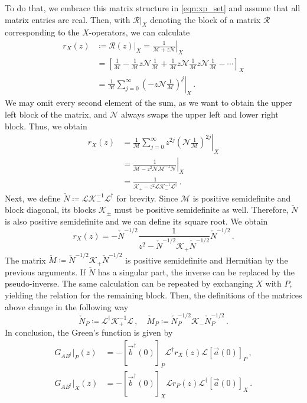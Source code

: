 \documentclass[
    reprint, 
    aps,
    preprintnumbers,
    twocolumn,
    prb,
    superscriptaddress
]{revtex4-2}
\newcommand{\mM}{\mathcal{M}}
\newcommand{\mN}{\mathcal{N}}
\begin{document}
To do that, we embrace this matrix structure in \eqref{eqn:xp_set} and assume that all matrix entries are real.
Then, with $\mathcal{R}|_X$ denoting the block of a matrix $\mathcal{R}$ corresponding to the $X$-operators, we can calculate
\begin{align}
    r_X (z) &\coloneqq \mathcal{R}(z)|_X = \left. \frac{1}{\mM + z \mN} \right\vert_X \nonumber \\
        &= \left[ \frac{1}{\mM} - \frac{1}{\mM} z \mN \frac{1}{\mM} + \frac{1}{\mM} z \mN \frac{1}{\mM} z \mN \frac{1}{\mM} - \cdots \right]_X \nonumber \\
        &= \left. \frac{1}{\mM} \sum_{j=0}^\infty \left( -z \mN \frac{1}{\mM} \right)^j \right\vert_X \,.
\end{align}
We may omit every second element of the sum, as we want to obtain the upper left block of the matrix, and $\mN$ always swaps the upper left and lower right block.
Thus, we obtain
\begin{align}
    r_X (z) &= \left. \frac{1}{\mM} \sum_{j=0}^\infty z^{2j} \left( \mN \frac{1}{\mM} \right)^{2j} \right\vert_X \nonumber \\
        &= \left. \frac{1}{\mM - z^2 \mN \mM^{-1} \mN} \right\vert_X \nonumber \\
        &= \frac{1}{\mathcal{K}_+ - z^2 \mathcal{L} \mathcal{K}_-^{-1} \mathcal{L}^\dagger}\,.
\end{align}
Next, we define $\check{N} \coloneqq \mathcal{L} \mathcal{K}_-^{-1} \mathcal{L}^\dagger$ for brevity.
Since $\mathcal{M}$ is positive semidefinite and block diagonal, its blocks $\mathcal{K}_\pm$ must be positive semidefinite as well.
Therefore, $\check{N}$ is also positive semidefinite and we can define its square root.
We obtain
\begin{equation}
    r_X (z) = -\check{N}^{-1/2} \frac{1}{z^2 - \check{N}^{-1/2} \mathcal{K}_+ \check{N}^{-1/2}} \check{N}^{-1/2}\,.
\end{equation}
The matrix $\check{M} \coloneqq \check{N}^{-1/2} \mathcal{K}_+ \check{N}^{-1/2}$ is positive semidefinite and Hermitian by the previous arguments.
If $\check{N}$ has a singular part, the inverse can be replaced by the pseudo-inverse.
The same calculation can be repeated by exchanging $X$ with $P$, yielding the relation for the remaining block.
Then, the definitions of the matrices above change in the following way
\begin{equation}
    \check{N}_P \coloneqq \mathcal{L}^\dagger \mathcal{K}_+^{-1} \mathcal{L}\,,\quad \check{M}_P \coloneqq \check{N}_P^{-1/2} \mathcal{K}_- \check{N}_P^{-1/2}\,.
\end{equation}
In conclusion, the Green's function is given by
\begin{subequations}
    \begin{align}
        G_{AB^\dagger} \vert_P (z) &= - \left[ \vec{b}^\dagger (0) \right]_P \mathcal{L}^\dagger r_X (z) \mathcal{L} \left[ \vec{a}(0) \right]_P\,, \\
        G_{AB^\dagger} \vert_X (z) &= - \left[ \vec{b}^\dagger (0) \right]_X \mathcal{L} r_P (z) \mathcal{L}^\dagger \left[ \vec{a}(0) \right]_X\,.
    \end{align}
\end{subequations}
\end{document}
